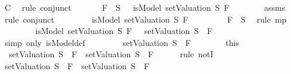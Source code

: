 \begin{isabellebody}
\ C\ \isamarkupfalse%
\ {\isacharparenleft}rule\ conjunct{}{\isacharparenright}\isanewline
\ \ \ \ \isamarkupfalse%
\ {\isachardoublequoteopen}\isactrlbold {\isasymnot}\ F{}\ {\isasymin}\ S\ {\isasymlongrightarrow}\ {\isasymnot}\ isModel\ {\isacharparenleft}setValuation\ S{\isacharparenright}\ F{}{\isachardoublequoteclose}\isanewline
\ \ \ \ \ \ \isamarkupfalse%
\ assms{\isacharparenleft}{}{\isacharparenright}\ \isamarkupfalse%
\ {\isacharparenleft}rule\ conjunct{}{\isacharparenright}\isanewline
\ \ \ \ \isamarkupfalse%
\ \isamarkupfalse%
\ {\isachardoublequoteopen}{\isasymnot}\ isModel\ {\isacharparenleft}setValuation\ S{\isacharparenright}\ F{}{\isachardoublequoteclose}\isanewline
\ \ \ \ \ \ \isamarkupfalse%
\ {\isacartoucheopen}\isactrlbold {\isasymnot}\ F{}\ {\isasymin}\ S{\isacartoucheclose}\ \isamarkupfalse%
\ {\isacharparenleft}rule\ mp{\isacharparenright}\isanewline
\ \ \ \ \isamarkupfalse%
\ \isamarkupfalse%
\ {\isachardoublequoteopen}{\isacharparenleft}{\isasymnot}\ isModel\ {\isacharparenleft}setValuation\ S{\isacharparenright}\ F{}{\isacharparenright}\ {\isacharequal}\ {\isacharparenleft}{\isasymnot}\ {\isacharparenleft}setValuation\ S{\isacharparenright}\ {\isasymTurnstile}\ F{}{\isacharparenright}{\isachardoublequoteclose}\isanewline
\ \ \ \ \ \ \isamarkupfalse%
\ {\isacharparenleft}simp\ only{\isacharcolon}\ isModel{\isacharunderscore}def{\isacharparenright}\isanewline
\ \ \ \ \isamarkupfalse%
\ \isamarkupfalse%
\ {\isachardoublequoteopen}{\isasymnot}\ {\isacharparenleft}setValuation\ S{\isacharparenright}\ {\isasymTurnstile}\ F{}{\isachardoublequoteclose}\isanewline
\ \ \ \ \ \ \isamarkupfalse%
\ this\isanewline
\ \ \ \ \isamarkupfalse%
\ {\isachardoublequoteopen}{\isasymnot}\ {\isacharparenleft}{\isacharparenleft}setValuation\ S{\isacharparenright}\ {\isasymTurnstile}\ F{}\ {\isasymlongrightarrow}\ {\isacharparenleft}setValuation\ S{\isacharparenright}\ {\isasymTurnstile}\ F{}{\isacharparenright}{\isachardoublequoteclose}\isanewline
\ \ \ \ \isamarkupfalse%
\ {\isacharparenleft}rule\ notI{\isacharparenright}\isanewline
\ \ \ \ \ \ \isamarkupfalse%
\ {\isachardoublequoteopen}{\isacharparenleft}setValuation\ S{\isacharparenright}\ {\isasymTurnstile}\ F{}\ {\isasymlongrightarrow}\ {\isacharparenleft}setValuation\ S{\isacharparenright}\ {\isasymTurnstile}\ F{}{\isachardoublequoteclose}\isanewline

\end{isabellebody}
